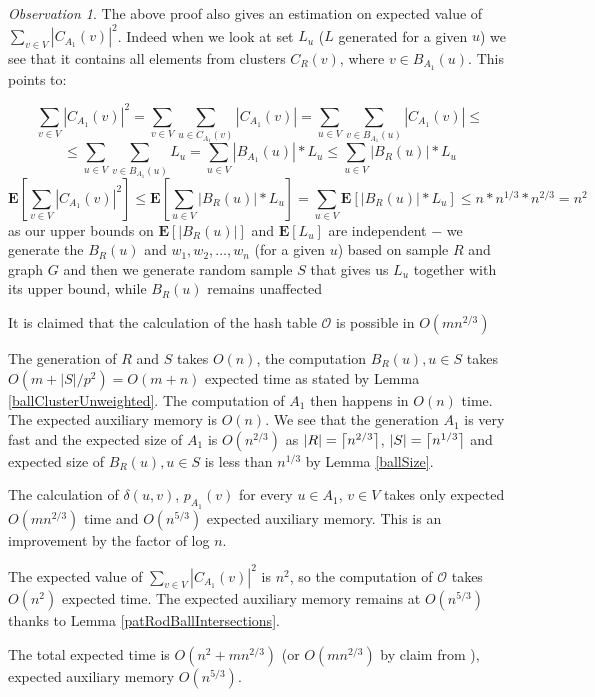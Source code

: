 \documentclass[shortabstract, lic, english]{iithesis}
\theoremstyle{definition} \newtheorem{definition}{Definition}[chapter]
\theoremstyle{remark} \newtheorem{remark}[definition]{Observation}
\theoremstyle{plain} \newtheorem{theorem}[definition]{Theorem}
\theoremstyle{plain} \newtheorem{lemma}[definition]{Lemma}
\theoremstyle{plain} \newtheorem{conjecture}[definition]{Conjecture}
\DeclarePairedDelimiter{\ceil}{\lceil}{\rceil}
\begin{document}
\begin{remark}
    The above proof also gives an estimation on expected value of $\sum_{v \in V}|C_{A_1}(v)|^2$.
    Indeed when we look at set $L_u$ ($L$ generated for a given $u$) we see that it contains all elements from clusters $C_R(v)$, where $v \in B_{A_1}(u)$.
    This points to:

    $$\sum_{v \in V}|C_{A_1}(v)|^2 = \sum_{v \in V}\sum_{u \in C_{A_1}(v)}|C_{A_1}(v)| = \sum_{u \in V}\sum_{v \in B_{A_1}(u)} |C_{A_1}(v)| \leq$$
    $$\leq \sum_{u \in V}\sum_{v \in B_{A_1}(u)} L_u = \sum_{u \in V} |B_{A_1}(u)| * L_u \leq \sum_{u \in V} |B_R(u)| * L_u$$
    $$\mathbf{E}[\sum_{v \in V}|C_{A_1}(v)|^2] \leq \mathbf{E}[\sum_{u \in V} |B_R(u)| * L_u] = \sum_{u \in V} \mathbf{E}[|B_R(u)| * L_u] \leq n * n^{1/3} * n^{2/3} = n^2$$
    as our upper bounds on $\mathbf{E}[|B_R(u)|]$ and $\mathbf{E}[L_u]$ are independent $-$ we generate the $B_R(u)$ and $w_1, w_2, \ldots, w_n$ (for a given $u$) based on sample $R$ and graph $G$
    and then we generate random sample $S$ that gives us $L_u$ together with its upper bound, while $B_R(u)$ remains unaffected
\end{remark}

It is claimed that the calculation of the hash table $\mathcal{O}$ is possible in $O(mn^{2/3})$ \cite{21OracleSpannerNoPenaltyNoLog}

The generation of $R$ and $S$ takes $O(n)$,
the computation $B_R(u), u \in S$ takes $O(m + |S|/p^2) = O(m + n)$ expected time as stated by Lemma \ref{ballClusterUnweighted}.
The computation of $A_1$ then happens in $O(n)$ time. The expected auxiliary memory is $O(n)$.
We see that the generation $A_1$ is very fast and the expected size of $A_1$ is $O(n^{2/3})$
as $|R| = \ceil[\big]{n^{2/3}}$, $|S| = \ceil[\big]{n^{1/3}}$ and expected size of $B_R(u), u \in S$ is less than $n^{1/3}$ by Lemma \ref{ballSize}.

The calculation of $\delta(u,v)$, $p_{A_1}(v)$ for every $u \in A_1$, $v \in V$ takes only expected $O(mn^{2/3})$ time and $O(n^{5/3})$ expected auxiliary memory.
This is an improvement by the factor of log $n$.

The expected value of $\sum_{v \in V}|C_{A_1}(v)|^2$ is $n^2$, so the computation of $\mathcal{O}$ takes $O(n^2)$ expected time.
The expected auxiliary memory remains at $O(n^{5/3})$ thanks to Lemma \ref{patRodBallIntersections}.

The total expected time is $O(n^{2} + mn^{2/3})$ (or $O(mn^{2/3})$ by claim from \cite{21OracleSpannerNoPenaltyNoLog}), expected auxiliary memory $O(n^{5/3})$.
\end{document}
